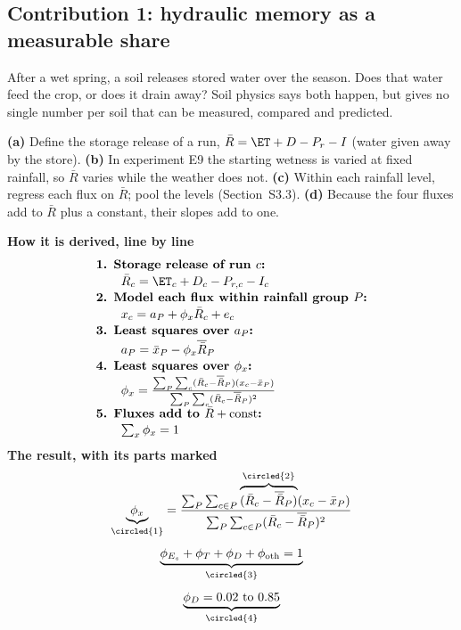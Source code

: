 \subsection{Contribution 1: hydraulic memory as a measurable share}
\begin{problem}
After a wet spring, a soil releases stored water over the season. Does that water feed the crop, or does it drain away? Soil physics says both happen, but gives no single number per soil that can be measured, compared and predicted.
\end{problem}
\begin{derivation}
\textbf{(a)} Define the storage release of a run, $\bar R=\ET+D-P_r-I$ (water given away by the store). \textbf{(b)} In experiment E9 the starting wetness is varied at fixed rainfall, so $\bar R$ varies while the weather does not. \textbf{(c)} Within each rainfall level, regress each flux on $\bar R$; pool the levels (Section~S3.3). \textbf{(d)} Because the four fluxes add to $\bar R$ plus a constant, their slopes add to one.
\end{derivation}
\begin{keyresult}
\begin{pencil}
{\small\noindent\textbf{How it is derived, line by line}
\[\begin{array}{@{}l@{}}\textbf{1. Storage release of run } c\textbf{:}\\[1pt]
\qquad \bar R_c=\ET_c+D_c-P_{r,c}-I_c\\[1pt]
\textbf{2. Model each flux within rainfall group } P\textbf{:}\\[1pt]
\qquad x_c=a_P+\phi_x\bar R_c+e_c\\[1pt]
\textbf{3. Least squares over } a_P\textbf{:}\\[1pt]
\qquad a_P=\bar x_P-\phi_x\overline{\bar R}_P\\[1pt]
\textbf{4. Least squares over } \phi_x\textbf{:}\\[1pt]
\qquad \phi_x=\frac{\sum_P\sum_c(\bar R_c-\overline{\bar R}_P)(x_c-\bar x_P)}{\sum_P\sum_c(\bar R_c-\overline{\bar R}_P)^2}\\[1pt]
\textbf{5. Fluxes add to } \bar R+\text{const}\textbf{:}\\[1pt]
\qquad \textstyle\sum_x\phi_x=1
\end{array}\]}
\noindent\textbf{The result, with its parts marked}
\[
\underbrace{\phi_x}_{\circled{1}}=\frac{\sum_P\sum_{c\in P}\overbrace{(\bar R_c-\overline{\bar R}_P)}^{\circled{2}}(x_c-\bar x_P)}{\sum_P\sum_{c\in P}(\bar R_c-\overline{\bar R}_P)^2}\]
\[\underbrace{\phi_{E_s}+\phi_T+\phi_D+\phi_{\mathrm{oth}}=1}_{\circled{3}}\]
\[\underbrace{\phi_D=0.02\ \text{to}\ 0.85}_{\circled{4}}
\]
\end{pencil}
\end{keyresult}
